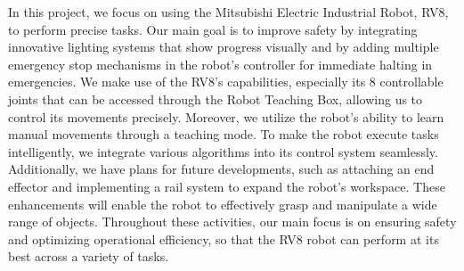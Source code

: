 In this project, we focus on using the Mitsubishi Electric Industrial Robot, RV8, to perform precise tasks. Our main goal is to improve safety by integrating innovative lighting systems that show progress visually and by adding multiple emergency stop mechanisms in the robot's controller for immediate halting in emergencies. We make use of the RV8's capabilities, especially its 8 controllable joints that can be accessed through the Robot Teaching Box, allowing us to control its movements precisely. Moreover, we utilize the robot's ability to learn manual movements through a teaching mode. To make the robot execute tasks intelligently, we integrate various algorithms into its control system seamlessly. Additionally, we have plans for future developments, such as attaching an end effector and implementing a rail system to expand the robot's workspace. These enhancements will enable the robot to effectively grasp and manipulate a wide range of objects. Throughout these activities, our main focus is on ensuring safety and optimizing operational efficiency, so that the RV8 robot can perform at its best across a variety of tasks. 